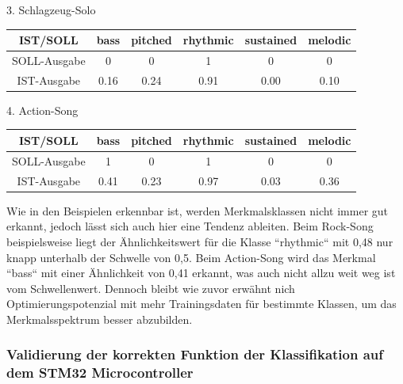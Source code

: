 \begin{adjustwidth}{0.5cm}{0cm}
3. Schlagzeug-Solo

\begin{tabular}{|c|c|c|c|c|c|}
    \hline
    IST/SOLL & bass & pitched & rhythmic & sustained & melodic \\ \hline
    SOLL-Ausgabe & 0 & 0 & 1 & 0 & 0 \\ \hline
    IST-Ausgabe & 0.16 & 0.24 & 0.91 & 0.00 & 0.10 \\ \hline
\end{tabular}

4. Action-Song

\begin{tabular}{|c|c|c|c|c|c|}
    \hline
    IST/SOLL & bass & pitched & rhythmic & sustained & melodic \\ \hline
    SOLL-Ausgabe & 1 & 0 & 1 & 0 & 0 \\ \hline
    IST-Ausgabe & 0.41 & 0.23 & 0.97 & 0.03 & 0.36 \\ \hline
\end{tabular}

Wie in den Beispielen erkennbar ist, werden Merkmalsklassen nicht immer gut erkannt, jedoch lässt sich auch hier eine Tendenz ableiten. Beim Rock-Song beispielsweise liegt der Ähnlichkeitswert für die Klasse ``rhythmic`` mit 0,48 nur knapp unterhalb der Schwelle von 0,5. Beim Action-Song wird das Merkmal ``bass`` mit einer Ähnlichkeit von 0,41 erkannt, was auch nicht allzu weit weg ist vom Schwellenwert. Dennoch bleibt wie zuvor erwähnt nich Optimierungspotenzial mit mehr Trainingsdaten für bestimmte Klassen, um das Merkmalsspektrum besser abzubilden.

\end{adjustwidth}

%
%
%
%

\subsubsection{Validierung der korrekten Funktion der Klassifikation auf dem STM32 Microcontroller}
